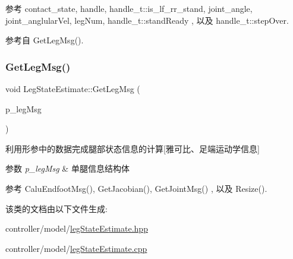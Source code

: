 参考 contact\+\_\+state, handle, handle\+\_\+t\+::is\+\_\+lf\+\_\+rr\+\_\+stand, joint\+\_\+angle, joint\+\_\+anglular\+Vel, leg\+Num, handle\+\_\+t\+::stand\+Ready , 以及 handle\+\_\+t\+::step\+Over.



参考自 Get\+Leg\+Msg().

\mbox{\label{classquadruped_1_1LegStateEstimate_a145521c0273b7f45c3a48e1a268ce6c7}} 
\subsubsection{\texorpdfstring{Get\+Leg\+Msg()}{GetLegMsg()}}
{\footnotesize\ttfamily void Leg\+State\+Estimate\+::\+Get\+Leg\+Msg (\begin{DoxyParamCaption}\item[{\hyperlink{structlegMsg__t}{leg\+Msg\+\_\+t}}]{p\+\_\+leg\+Msg }\end{DoxyParamCaption})}



利用形参中的数据完成腿部状态信息的计算\mbox{[}雅可比、足端运动学信息\mbox{]} 


\begin{DoxyParams}{参数}
{\em p\+\_\+leg\+Msg} & 单腿信息结构体 \\
\hline
\end{DoxyParams}


参考 Calu\+Endfoot\+Msg(), Get\+Jacobian(), Get\+Joint\+Msg() , 以及 Resize().



该类的文档由以下文件生成\+:\begin{DoxyCompactItemize}
\item 
controller/model/\hyperlink{legStateEstimate_8hpp}{leg\+State\+Estimate.\+hpp}\item 
controller/model/\hyperlink{legStateEstimate_8cpp}{leg\+State\+Estimate.\+cpp}\end{DoxyCompactItemize}
